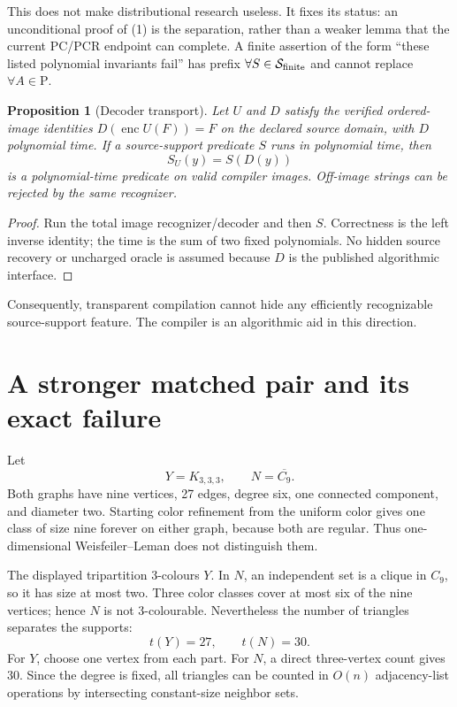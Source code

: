 \documentclass[11pt]{article}
\newtheorem{proposition}[theorem]{Proposition}
\begin{document}
This does not make distributional research useless.  It fixes its status:
an unconditional proof of (1) is the separation, rather than a weaker lemma
that the current PC/PCR endpoint can complete.  A finite assertion of the
form ``these listed polynomial invariants fail'' has prefix
$\forall S\in\mathcal S_{\rm finite}$ and cannot replace
$\forall A\in\mathrm P$.

\begin{proposition}[Decoder transport]
Let $U$ and $D$ satisfy the verified ordered-image identities
$D(\operatorname{enc}U(F))=F$ on the declared source domain, with $D$
polynomial time.  If a source-support predicate $S$ runs in polynomial time,
then
\[
                  S_U(y)=S(D(y))                           \tag{3}
\]
is a polynomial-time predicate on valid compiler images.  Off-image strings
can be rejected by the same recognizer.
\end{proposition}
\begin{proof}
Run the total image recognizer/decoder and then $S$.  Correctness is the left
inverse identity; the time is the sum of two fixed polynomials.  No hidden
source recovery or uncharged oracle is assumed because $D$ is the published
algorithmic interface.
\end{proof}
Consequently, transparent compilation cannot hide any efficiently
recognizable source-support feature.  The compiler is an algorithmic aid in
this direction.

\section{A stronger matched pair and its exact failure}
Let
\[
                   Y=K_{3,3,3},\qquad N=\overline{C_9}.    \tag{4}
\]
Both graphs have nine vertices, 27 edges, degree six, one connected
component, and diameter two.  Starting color refinement from the uniform
color gives one class of size nine forever on either graph, because both are
regular.  Thus one-dimensional Weisfeiler--Leman does not distinguish them.

The displayed tripartition 3-colours $Y$.  In $N$, an independent set is a
clique in $C_9$, so it has size at most two.  Three color classes cover at
most six of the nine vertices; hence $N$ is not 3-colourable.  Nevertheless
the number of triangles separates the supports:
\[
                        t(Y)=27,
             \qquad     t(N)=30.                           \tag{5}
\]
For $Y$, choose one vertex from each part.  For $N$, a direct three-vertex
count gives 30.  Since the degree is fixed, all triangles can be counted in
$O(n)$ adjacency-list operations by intersecting constant-size neighbor
sets.
\end{document}
